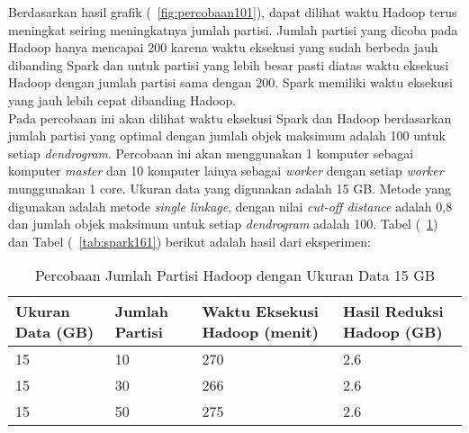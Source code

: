 Berdasarkan hasil grafik (~\ref{fig:percobaan101}), dapat dilihat waktu Hadoop terus meningkat seiring meningkatnya jumlah partisi. Jumlah partisi yang dicoba pada Hadoop hanya mencapai 200 karena waktu eksekusi yang sudah berbeda jauh dibanding Spark dan untuk partisi yang lebih besar pasti diatas waktu eksekusi Hadoop dengan jumlah partisi sama dengan 200. Spark memiliki waktu eksekusi yang jauh lebih cepat dibanding Hadoop.  \\





Pada percobaan ini akan dilihat waktu eksekusi Spark dan Hadoop berdasarkan jumlah partisi yang optimal dengan jumlah objek maksimum adalah 100 untuk setiap \textit{dendrogram}. Percobaan ini akan menggunakan 1 komputer sebagai komputer \textit{master} dan 10 komputer lainya sebagai \textit{worker} dengan setiap \textit{worker} munggunakan 1 core. Ukuran data yang digunakan adalah 15 GB. Metode yang digunakan adalah metode \textit{single linkage}, dengan nilai \textit{cut-off distance} adalah 0,8 dan jumlah objek maksimum untuk setiap \textit{dendrogram} adalah 100. Tabel (~\ref{tab:spark151}) dan Tabel (~\ref{tab:spark161}) berikut adalah hasil dari eksperimen:





\begin{table}[H] 
	\centering 
	\caption{Percobaan Jumlah Partisi Hadoop dengan Ukuran Data 15 GB}
	\label{tab:spark151}
	\begin{tabular}{|p{3cm}|p{3cm}|p{4cm}|p{4cm}|}
\hline
Ukuran Data (GB) & Jumlah Partisi &  Waktu Eksekusi Hadoop (menit) & Hasil Reduksi Hadoop (GB)\\
\hline
15 & 10 & 270  & 2.6  \\
\hline
15 & 30 & 266  & 2.6  \\
\hline
15 & 50 & 275  & 2.6  \\
\hline


\hline

	\end{tabular} 
\end{table}




